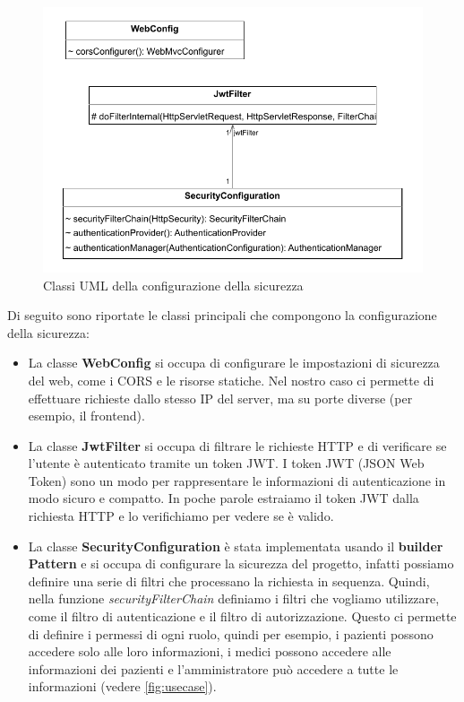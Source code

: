 \documentclass[a4paper]{article}
\begin{document}
\begin{figure}[H]
  \begin{center}
    \includegraphics[width=1\textwidth]{config.pdf}
  \end{center}
  \caption{Classi UML della configurazione della sicurezza} 
\end{figure}
\noindent
Di seguito sono riportate le classi principali che compongono la configurazione della sicurezza:
\begin{itemize}
  \item La classe \textbf{WebConfig} si occupa di configurare le impostazioni di sicurezza del web, come i CORS e le risorse statiche.
  Nel nostro caso ci permette di effettuare richieste dallo stesso IP del server, ma su porte diverse (per esempio, il frontend).
  \item La classe \textbf{JwtFilter} si occupa di filtrare le richieste HTTP e di verificare se l'utente è autenticato tramite un token JWT.
  I token JWT (JSON Web Token) sono un modo per rappresentare le informazioni di autenticazione in modo sicuro e compatto.
  In poche parole estraiamo il token JWT dalla richiesta HTTP e lo verifichiamo per vedere se è valido.
  \item La classe \textbf{SecurityConfiguration} è stata implementata usando il \textbf{builder Pattern} e si occupa di configurare la sicurezza del progetto,
  infatti possiamo definire una serie di filtri che processano la richiesta in sequenza.
  Quindi, nella funzione \textit{securityFilterChain} definiamo i filtri che vogliamo utilizzare, come il filtro di autenticazione e il filtro di autorizzazione.
  Questo ci permette di definire i permessi di ogni ruolo, quindi per esempio, i pazienti possono accedere solo alle loro informazioni, i medici possono accedere alle informazioni dei pazienti 
  e l'amministratore può accedere a tutte le informazioni (vedere \ref{fig:usecase}).
\end{itemize}
\end{document}
